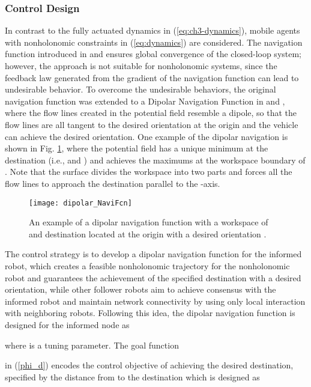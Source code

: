 \documentclass[english]{IOS-Book-Article}
\theoremstyle{definition}
\theoremstyle{definition}
\begin{document}
\subsubsection{Control Design}

In contrast to the fully actuated dynamics in (\ref{eq:ch3-dynamics}),
mobile agents with nonholonomic constraints in (\ref{eq:dynamics})
are considered. The navigation function introduced in \cite{Rimon1992}
and \cite{Rimon_1990} ensures global convergence of the closed-loop
system; however, the approach is not suitable for nonholonomic systems,
since the feedback law generated from the gradient of the navigation
function can lead to undesirable behavior. To overcome the undesirable
behaviors, the original navigation function was extended to a Dipolar
Navigation Function in \cite{Tanner2000} and \cite{Tanner2003},
where the flow lines created in the potential field resemble a dipole,
so that the flow lines are all tangent to the desired orientation
at the origin and the vehicle can achieve the desired orientation.
One example of the dipolar navigation is shown in Fig. \ref{fig:dipolar},
where the potential field has a unique minimum at the destination
(i.e.,  and )
and achieves the maximums at the workspace boundary of .
Note that the surface  divides the workspace into two parts
and forces all the flow lines to approach the destination parallel
to the -axis.

\begin{figure}
\centering{}\texttt{[image: dipolar\_NaviFcn]}

\caption{An example of a dipolar navigation function with a workspace of 
and destination located at the origin with a desired orientation .}


\label{fig:dipolar}
\end{figure}


The control strategy is to develop a dipolar navigation function for
the informed robot, which creates a feasible nonholonomic trajectory
for the nonholonomic robot and guarantees the achievement of the specified
destination with a desired orientation, while other follower robots
aim to achieve consensus with the informed robot and maintain network
connectivity by using only local interaction with neighboring robots.
Following this idea, the dipolar navigation function is designed for
the informed node  as 

where  is a tuning parameter. The goal function

in (\ref{phi_d}) encodes the control objective of achieving the desired
destination, specified by the distance from 
to the destination  which is designed
as 
\end{document}
